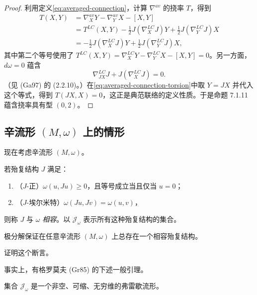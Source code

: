 \begin{proof}
利用定义\eqref{eq:averaged-connection}，计算 $\nabla^{av}$ 的挠率 $T$，得到
\begin{equation}
\begin{split}
 T(X,Y)
 &=\nabla_X^{av}Y-\nabla_Y^{av}X-[X,Y]\\
 &=T^{LC}(X,Y)-\frac12J(\nabla_X^{LC}J)Y
 +\frac12J(\nabla_Y^{LC}J)X\\
 &=-\frac12J(\nabla_X^{LC}J)Y
 +\frac12J(\nabla_Y^{LC}J)X,
\end{split}
 \label{eq:averaged-connection-torsion}
\end{equation}
其中第二个等号使用了
$T^{LC}(X,Y)=\nabla_X^{LC}Y-\nabla_Y^{LC}X-[X,Y]=0$。另一方面，$d\omega=0$ 蕴含
\[
 \nabla_{JX}^{LC}J+J(\nabla_X^{LC}J)=0.
\]
（见 (Ga97) 的 (2.2.10)。）在\eqref{eq:averaged-connection-torsion}中取 $Y=JX$ 并代入这个等式，得到 $T(JX,X)=0$，这正是典范联络的定义性质。于是命题 7.1.11 蕴含挠率具有型 $(0,2)$。
\end{proof}

\subsection{辛流形 \texorpdfstring{$(M,\omega)$}{(M, omega)} 上的情形}
\label{subsec:canonical-connection-symplectic-manifolds}

现在考虑辛流形 $(M,\omega)$。

\begin{definition}\label{def:compatible-almost-complex-structure}
若殆复结构 $J$ 满足：
\begin{enumerate}[label=(\roman*)]
 \item （$J$-正）$\omega(u,Ju)\geq0$，且等号成立当且仅当 $u=0$；
 \item （$J$-埃尔米特）$\omega(Ju,Jv)=\omega(u,v)$，
\end{enumerate}
则称 $J$ 与 $\omega$ \emph{相容}。以 $\mathcal J_\omega$ 表示所有这种殆复结构的集合。
\end{definition}

极分解保证在任意辛流形 $(M,\omega)$ 上总存在一个相容殆复结构。

\begin{exercise}\label{ex:compatible-almost-complex-exists}
证明这个断言。
\end{exercise}

事实上，有格罗莫夫 (Gr85) 的下述一般引理。

\begin{lemma}[格罗莫夫]\label{lem:compatible-almost-complex-contractible}
集合 $\mathcal J_\omega$ 是一个非空、可缩、无穷维的弗雷歇流形。
\end{lemma}

